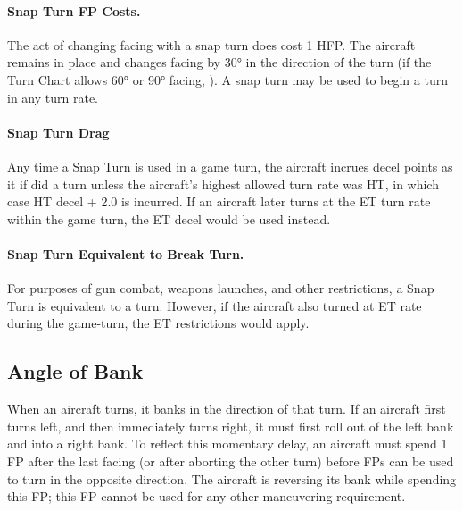\paragraph{Snap Turn FP Costs.} The act of changing facing with a snap turn does cost 1 HFP.  The aircraft remains in place and changes facing by 30° in the direction of the turn (if the Turn Chart allows 60° or 90° facing, ). A snap turn may be used to begin a turn in any turn rate.

\paragraph{Snap Turn Drag} Any time a Snap Turn is used in a game turn, the aircraft incrues decel points as it if did a  turn unless the aircraft's highest allowed turn rate was HT, in which case HT decel + 2.0 is incurred. If an aircraft later turns at the ET turn rate within the game turn, the ET decel would be used instead.

\paragraph{Snap Turn Equivalent to Break Turn.} For purposes of gun combat, weapons launches, and other restrictions, a Snap Turn is equivalent to a  turn. However, if the aircraft also turned at ET rate during the game-turn, the ET restrictions would apply.

\subsection{Angle of Bank}

When an aircraft turns, it banks in the direction of that turn.  If an aircraft first turns left, and then immediately turns right, it must first roll out of the left bank and into a right bank. To reflect this momentary delay, an aircraft must spend 1 FP after the last facing (or after aborting the other turn) before FPs can be used to turn in the opposite direction. The aircraft is reversing its bank while spending this FP; this FP cannot be used for any other maneuvering requirement.

